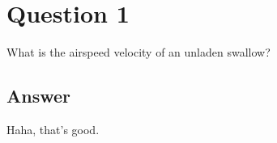 ﻿\section{Question 1}

What is the airspeed velocity of an unladen swallow?


\subsection{Answer}

Haha, that's good.